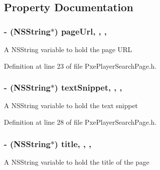 \subsection{Property Documentation}
\hypertarget{interface_pxe_player_search_page_af61fb16410b027d925410724f7654f9a}{
\subsubsection[{page\-Url}]{\setlength{\rightskip}{0pt plus 5cm}-\/ (N\-S\-String$\ast$) page\-Url\hspace{0.3cm}{\ttfamily [read]}, {\ttfamily [write]}, {\ttfamily [nonatomic]}, {\ttfamily [strong]}}}\label{interface_pxe_player_search_page_af61fb16410b027d925410724f7654f9a}
A N\-S\-String variable to hold the page U\-R\-L 

Definition at line 23 of file Pxe\-Player\-Search\-Page.\-h.

\hypertarget{interface_pxe_player_search_page_abcd4dc97b1e87dd2cda9dded238302a9}{
\subsubsection[{text\-Snippet}]{\setlength{\rightskip}{0pt plus 5cm}-\/ (N\-S\-String$\ast$) text\-Snippet\hspace{0.3cm}{\ttfamily [read]}, {\ttfamily [write]}, {\ttfamily [nonatomic]}, {\ttfamily [strong]}}}\label{interface_pxe_player_search_page_abcd4dc97b1e87dd2cda9dded238302a9}
A N\-S\-String variable to hold the text snippet 

Definition at line 28 of file Pxe\-Player\-Search\-Page.\-h.

\hypertarget{interface_pxe_player_search_page_a6a30adba13a3bc04aba74e5c72a68d45}{
\subsubsection[{title}]{\setlength{\rightskip}{0pt plus 5cm}-\/ (N\-S\-String$\ast$) title\hspace{0.3cm}{\ttfamily [read]}, {\ttfamily [write]}, {\ttfamily [nonatomic]}, {\ttfamily [strong]}}}\label{interface_pxe_player_search_page_a6a30adba13a3bc04aba74e5c72a68d45}
A N\-S\-String variable to hold the title of the page 

